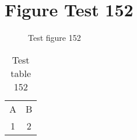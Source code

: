 \documentclass{article}
\begin{document}
\section{Figure Test 152}
\begin{figure}[h]
\caption{Test figure 152}
\end{figure}
\begin{table}[h]
\caption{Test table 152}
\begin{tabular}{cc}
A & B \\
1 & 2
\end{tabular}
\end{table}
\end{document}
